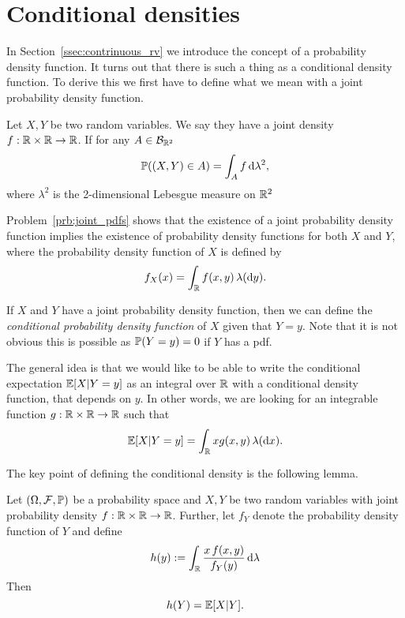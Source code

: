 \section{Conditional densities}

In Section~\ref{ssec:contrinuous_rv} we introduce the concept of a probability density function. It turns out that there is such a thing as a conditional density function. To derive this we first have to define what we mean with a joint probability density function.

\begin{definition}\label{def:joint_pdf}
Let $X,Y$ be two random variables. We say they have a joint density $f : \mathbb R \times \mathbb R \to \mathbb R$. If for any $A \in \mathcal B_{\mathbb R^2}$
\[
	\mathbb P((X,Y) \in A) = \int_A f \, \mathrm{d} \lambda^2,
\]
where $\lambda^2$ is the 2-dimensional Lebesgue measure on $\mathbb R^2$
\end{definition}

Problem~\ref{prb:joint_pdfs} shows that the existence of a joint probability density function implies the existence of probability density functions for both $X$ and $Y$, where the probability density function of $X$ is defined by
\[
	f_X(x) = \int_{\mathbb R} f(x,y) \, \lambda(\mathrm{d} y).
\] 

If $X$ and $Y$ have a joint probability density function, then we can define the \emph{conditional probability density function} of $X$ given that $Y = y$. Note that it is not obvious this is possible as $\mathbb P(Y = y) = 0$ if $Y$ has a pdf. 

The general idea is that we would like to be able to write the conditional expectation $\mathbb E[X | Y = y]$ as an integral over $\mathbb R$ with a conditional density function, that depends on $y$. In other words, we are looking for an integrable function $g : \mathbb R \times \mathbb R \to \mathbb R$ such that
\[
	\mathbb E[X | Y = y] = \int_{\mathbb R} x g(x,y) \, \lambda (\mathrm{d} x).
\]


The key point of defining the conditional density is the following lemma.


\begin{lemma}\label{lem:condition_expectation_Y_y}
Let $(\Omega, \mathcal F, \mathbb P)$ be a probability space and $X,Y$ be two random variables with joint probability density $f : \mathbb R \times \mathbb R \to \mathbb R$. Further, let $f_Y$ denote the probability density function of $Y$ and define
\[
	h(y) := \int_{\mathbb R} \frac{x \, f(x,y)}{f_Y(y)} \, \mathrm{d} \lambda
\]
Then
\[
	h(Y) = \mathbb E[X | Y].
\]
\end{lemma}

